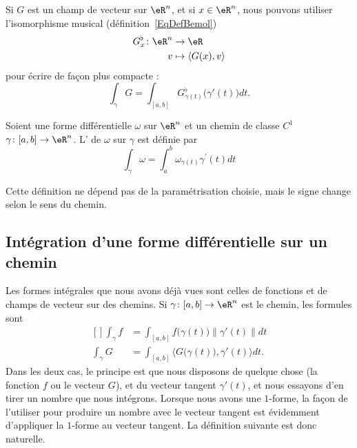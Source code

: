Si $G$ est un champ de vecteur sur $\eR^n$, et si $x\in\eR^n$, nous pouvons utiliser l'isomorphisme musical (définition~\ref{EqDefBemol})
\begin{equation}
	\begin{aligned}[]
		G^{\flat}_x\colon \eR^n&\to \eR \\
			v&\mapsto \langle G(x), v\rangle
	\end{aligned}
\end{equation}
pour écrire de façon plus compacte :
\begin{equation}
	\int_{\gamma}G=\int_{[a,b]} G^{\flat}_{\gamma(t)}\big( \gamma'(t)\big) dt.
\end{equation}

\begin{definition}      \label{DEFooRMHGooFtMEPB}
    Soient une forme différentielle \( \omega\) sur \( \eR^n\) et un chemin de classe \( C^1\) \( \gamma\colon \mathopen[ a , b \mathclose]\to \eR^n\). L' de \( \omega\) sur \( \gamma\) est définie par
    \begin{equation}    \label{EqEFIZyEe}
        \int_\gamma \omega = \int_a^b \omega_{\gamma(t)}\gamma^\prime(t) d t
    \end{equation}
\end{definition}

\begin{remark}
  Cette définition ne dépend pas de la paramétrisation choisie, mais le signe change selon le sens du chemin.
\end{remark}

\subsection{Intégration d'une forme différentielle sur un chemin}

Les formes intégrales que nous avons déjà vues sont celles de fonctions et de champs de vecteur sur des chemins. Si $\gamma\colon [a,b]\to \eR^n$ est le chemin, les formules sont
\begin{equation}
	\begin{aligned}[]
		\int_{\gamma}f&=\int_{[a,b]}f\big( \gamma(t) \big)\| \gamma'(t) \|dt\\
		\int_{\gamma}G&=\int_{[a,b]}\langle G\big( \gamma(t) \big), \gamma'(t)\rangle dt.
	\end{aligned}
\end{equation}
Dans les deux cas, le principe est que nous disposons de quelque chose (la fonction $f$ ou le vecteur $G$), et du vecteur tangent $\gamma'(t)$, et nous essayons d'en tirer un nombre que nous intégrons. Lorsque nous avons une $1$-forme, la façon de l'utiliser pour produire un nombre avec le vecteur tangent est évidemment d'appliquer la $1$-forme au vecteur tangent. La définition suivante est donc naturelle.

